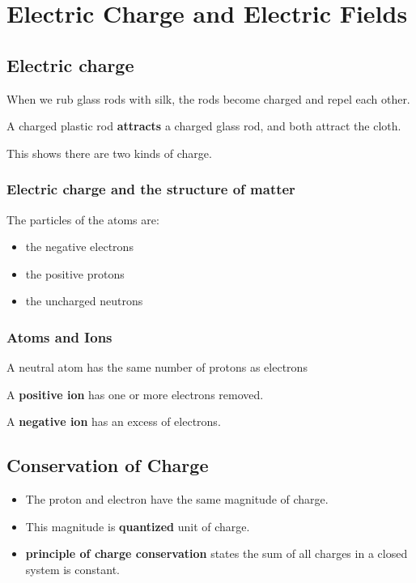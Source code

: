 \section{Electric Charge and Electric Fields}%
\label{sec:electric_charge_and_electric_fields}


\subsection{Electric charge}%
\label{sub:electric_charge}

When we rub glass rods with silk, the rods become charged and repel each other.

A charged plastic rod \textbf{attracts} a charged glass rod, and both attract the cloth.

This shows there are two kinds of charge.

\subsubsection{Electric charge and the structure of matter}%
\label{ssub:electric_charge_and_the_structure_of_matter}


The particles of the atoms are:

\begin{itemize}
	\item the negative electrons
	\item the positive protons
	\item the uncharged neutrons
\end{itemize}

\subsubsection{Atoms and Ions}%
\label{ssub:atoms_and_ions}

A neutral atom has the same number of protons as electrons

A \textbf{positive ion} has one or more electrons removed.

A \textbf{negative ion} has an excess of electrons.

\subsection{Conservation of Charge}%
\label{sub:conservation_of_charge}

\begin{itemize}
	\item The proton and electron have the same magnitude of charge.
	\item This magnitude is \textbf{quantized} unit of charge.
	\item \textbf{principle of charge conservation} states the sum of all charges in a closed system is constant.
\end{itemize}

